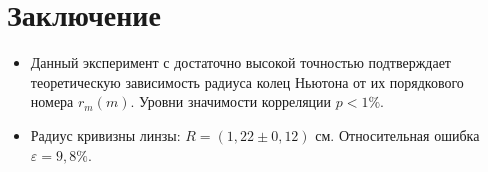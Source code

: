 \documentclass[a4paper,12pt]{article}
\theoremstyle{plain} %
\theoremstyle{definition} %
\theoremstyle{remark} %
\renewcommand{\epsilon}{\ensuremath{\varepsilon}}
\begin{document}
\section{Заключение}
\begin{itemize}
	\item Данный эксперимент с достаточно высокой точностью подтверждает теоретическую зависимость радиуса колец Ньютона от их порядкового номера $r_m(m)$. Уровни значимости корреляции  $p<1\%$.
	\item Радиус кривизны линзы: $R=(1,22\pm0,12)$ см. Относительная ошибка $\epsilon=9,8\%$.
\end{itemize} 



\end{document}
